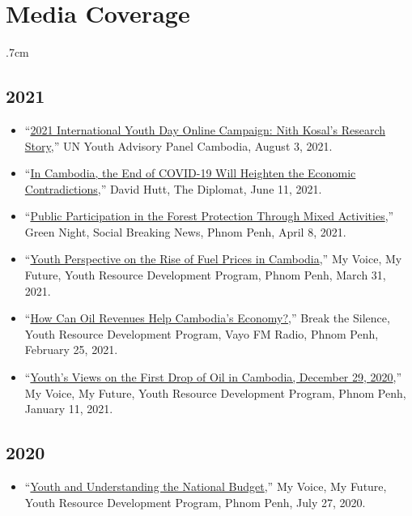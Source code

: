 \documentclass[10pt,a4paper]{article}
\begin{document}
\section*{Media Coverage}	
	\begin{adjustwidth}{.7cm}{}
		
	\subsection*{2021}
	\begin{itemize}[label={},itemindent=-2em,leftmargin=2em]
		\item ``\href{https://www.facebook.com/UNYAPCambodia/photos/a.1778939605680848/2997309793843817/}{2021 International Youth Day Online Campaign: Nith Kosal's Research Story},'' UN Youth Advisory Panel Cambodia, August 3, 2021. 
		
		\item ``\href{https://thediplomat.com/2021/06/in-cambodia-the-end-of-covid-19-will-heighten-the-economic-contradictions/}{In Cambodia, the End of COVID-19 Will Heighten the Economic Contradictions},'' David Hutt, The Diplomat, June 11, 2021.
		
		\item “\href{https://www.facebook.com/SBNKHMER/videos/134854181929606}{Public Participation in the Forest Protection Through Mixed Activities},” Green Night, Social Breaking News, Phnom Penh, April 8, 2021.
				
		\item ``\href{https://www.facebook.com/yrdpcambodiapage/videos/2881489105503837}{Youth Perspective on the Rise of Fuel Prices in Cambodia},” My Voice, My Future, Youth Resource Development Program, Phnom Penh, March 31, 2021.
				
		\item ``\href{https://www.facebook.com/yrdpcambodiapage/videos/128663862414486}{How Can Oil Revenues Help Cambodia's Economy?},” Break the Silence, Youth Resource Development Program, Vayo FM Radio, Phnom Penh, February 25, 2021.
			
		\item ``\href{https://www.facebook.com/yrdpcambodiapage/videos/436980507352194}{Youth's Views on the First Drop of Oil in Cambodia, December 29, 2020},” My Voice, My Future, Youth Resource Development Program, Phnom Penh, January 11, 2021. 
		
	\end{itemize}
	
			
	\subsection*{2020}
		\begin{itemize}[label={},itemindent=-2em,leftmargin=2em]
			\item “\href{https://www.facebook.com/yrdpcambodiapage/videos/3137988382950681}{Youth and Understanding the National Budget},” My Voice, My Future, Youth Resource Development Program, Phnom Penh, July 27, 2020.
		

\end{itemize}
\end{adjustwidth}
\end{document}
